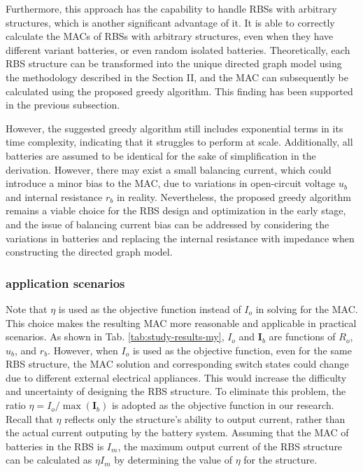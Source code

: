 \documentclass{article}
\begin{document}
Furthermore, this approach has the capability to handle RBSs with arbitrary structures, which is another significant advantage of it. 
It is able to correctly calculate the MACs of RBSs with arbitrary structures, even when they have different variant batteries, or even random isolated batteries. 
Theoretically, each RBS structure can be transformed into the unique directed graph model using the methodology described in the Section II, and the MAC can subsequently be calculated using the proposed greedy algorithm.
This finding has been supported in the previous subsection. 


However, the suggested greedy algorithm still includes exponential terms in its time complexity, indicating that it struggles to perform at scale. 
Additionally, all batteries are assumed to be identical for the sake of simplification in the derivation.
However, there may exist a small balancing current, which could introduce a minor bias to the MAC, due to variations in open-circuit voltage $u_b$ and internal resistance $r_b$ in reality.
Nevertheless, the proposed greedy algorithm remains a viable choice for the RBS design and optimization in the early stage, and the issue of balancing current bias can be addressed by considering the variations in batteries and replacing the internal resistance with impedance when constructing the directed graph model.

\subsubsection{application scenarios}

Note that $\eta$ is used as the objective function instead of $I_o$ in solving for the MAC. 
This choice makes the resulting MAC more reasonable and applicable in practical scenarios. 
As shown in Tab. \ref{tab:study-results-my}, $I_o$ and $\bm{I}_b$ are functions of $R_o$, $u_b$, and $r_b$. 
However, when $I_o$ is used as the objective function, even for the same RBS structure, the MAC solution and corresponding switch states could change due to different external electrical appliances.
This would increase the difficulty and uncertainty of designing the RBS structure. 
To eliminate this problem, the ratio $\eta=I_o/\max(\bm{I}_b)$ is adopted as the objective function in our research.
Recall that $\eta$ reflects only the structure's ability to output current, rather than the actual current outputing by the battery system.
Assuming that the MAC of batteries in the RBS is $I_m$, the maximum output current of the RBS structure can be calculated as $\eta I_m$ by determining the value of $\eta$ for the structure. 
\end{document}
